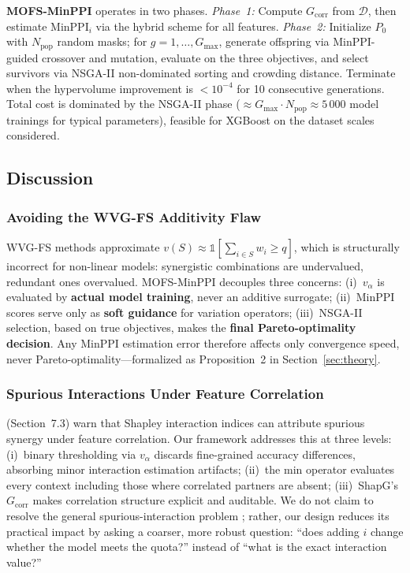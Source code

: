 \documentclass{article} %
\begin{document}
\textbf{MOFS-MinPPI} operates in two phases. \emph{Phase~1:} Compute $G_{\text{corr}}$ from $\mathcal{D}$, then estimate $\text{MinPPI}_i$ via the hybrid scheme for all features. \emph{Phase~2:} Initialize $P_0$ with $N_{\text{pop}}$ random masks; for $g=1,\dots,G_{\max}$, generate offspring via MinPPI-guided crossover and mutation, evaluate on the three objectives, and select survivors via NSGA-II non-dominated sorting and crowding distance. Terminate when the hypervolume improvement is $<10^{-4}$ for 10 consecutive generations. Total cost is dominated by the NSGA-II phase ($\approx G_{\max}\cdot N_{\text{pop}} \approx 5\,000$ model trainings for typical parameters), feasible for XGBoost on the dataset scales considered.

\subsection{Discussion}
\label{sec:discussion}

\subsubsection{Avoiding the WVG-FS Additivity Flaw}

WVG-FS methods approximate $v(S) \approx \mathbb{1}[\sum_{i\in S} w_i \geq q]$, which is structurally incorrect for non-linear models: synergistic combinations are undervalued, redundant ones overvalued. MOFS-MinPPI decouples three concerns: (i)~$v_\alpha$ is evaluated by \textbf{actual model training}, never an additive surrogate; (ii)~MinPPI scores serve only as \textbf{soft guidance} for variation operators; (iii)~NSGA-II selection, based on true objectives, makes the \textbf{final Pareto-optimality decision}. Any MinPPI estimation error therefore affects only convergence speed, never Pareto-optimality---formalized as Proposition~2 in Section~\ref{sec:theory}.

\subsubsection{Spurious Interactions Under Feature Correlation}

\citet{rabitti2019shapley} (Section~7.3) warn that Shapley interaction indices can attribute spurious synergy under feature correlation. Our framework addresses this at three levels: (i)~binary thresholding via $v_\alpha$ discards fine-grained accuracy differences, absorbing minor interaction estimation artifacts; (ii)~the min operator evaluates every context including those where correlated partners are absent; (iii)~ShapG's $G_{\text{corr}}$ makes correlation structure explicit and auditable. We do not claim to resolve the general spurious-interaction problem \citep{frye2020shapley,aas2021explaining,sundararajan2020many}; rather, our design reduces its practical impact by asking a coarser, more robust question: ``does adding $i$ change whether the model meets the quota?'' instead of ``what is the exact interaction value?''
\end{document}
